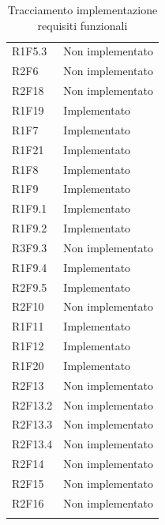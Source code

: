 \begin{longtable} {
            >{\centering}p{64.5mm} 
            >{}p{64.5mm}
            }
            R1F5.3 & Non implementato \TBstrut \\ [2mm]
            R2F6 & Non implementato \TBstrut \\ [2mm]
            R2F18 & Non implementato \TBstrut \\ [2mm]
            R1F19 & Implementato \TBstrut \\ [2mm]
            R1F7 & Implementato \TBstrut \\ [2mm]
            R1F21 & Implementato \TBstrut \\ [2mm]
            R1F8 & Implementato \TBstrut \\ [2mm]
            R1F9 & Implementato \TBstrut \\ [2mm]
            R1F9.1 & Implementato \TBstrut \\ [2mm]
            R1F9.2 & Implementato \TBstrut \\ [2mm]
            R3F9.3 & Non implementato \TBstrut \\ [2mm]
            R1F9.4 & Implementato \TBstrut \\ [2mm]
            R2F9.5 & Implementato \TBstrut \\ [2mm]
            R2F10 & Non implementato \TBstrut \\ [2mm]
            R1F11 & Implementato \TBstrut \\ [2mm]
            R1F12 & Implementato \TBstrut \\ [2mm]	
            R1F20 & Implementato \TBstrut \\ [2mm]	
            R2F13 &	Non implementato \TBstrut \\ [2mm]					
            R2F13.2 & Non implementato \TBstrut \\ [2mm]		
            R2F13.3 & Non implementato \TBstrut \\ [2mm]
            R2F13.4 & Non implementato \TBstrut \\ [2mm]		
            R2F14 &	Non implementato \TBstrut \\ [2mm]
            R2F15 &	Non implementato \TBstrut \\ [2mm]		
            R2F16 & Non implementato \TBstrut \\ [2mm]
            \rowcolor{white}
            \caption{Tracciamento implementazione requisiti funzionali}
        \end{longtable}
